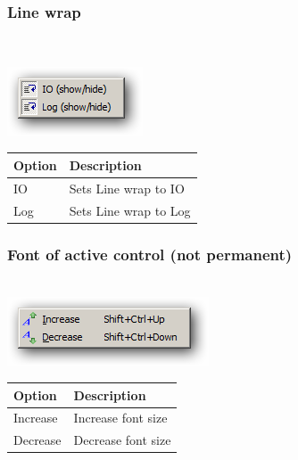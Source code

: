 \hypertarget{menu_view_r_rterm_linewrap}{}
\subsubsection{Line wrap}\\

\includegraphics[scale=0.50]{./res/menu_r_rterm_linewrap.png}\\

\begin{scriptsize}\begin{tabularx}{\textwidth}{>{\hsize=0.3\hsize}X>{\hsize=0.7\hsize}X}\\
    \hline
    \textbf{Option} & \textbf{Description} \\
    \hline
    IO & Sets Line wrap to IO \\
    Log & Sets Line wrap to Log \\
    \hline
  \end{tabularx}\end{scriptsize}


\hypertarget{menu_r_rterm_fontsize}{}
\subsubsection{Font of active control (not permanent)}\\

\includegraphics[scale=0.50]{./res/menu_fontsize_generic.png}\\

\begin{scriptsize}\begin{tabularx}{\textwidth}{>{\hsize=0.3\hsize}X>{\hsize=0.7\hsize}X}\\
    \hline
    \textbf{Option} & \textbf{Description} \\
    \hline
    Increase & Increase font size \\
    Decrease & Decrease font size \\
    \hline
  \end{tabularx}\end{scriptsize}



